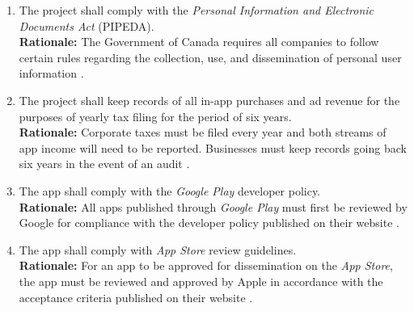 \documentclass{article}
\begin{document}


\begin{enumerate}[align=left, label=\textbf{CO\arabic*.}]
    \item The project shall comply with the \emph{Personal Information and Electronic Documents Act} (PIPEDA).\\
    {\bf Rationale:} The Government of Canada requires all companies to follow certain rules regarding the collection, use, and dissemination of personal user information \cite{PIPEDA}.
    \item The project shall keep records of all in-app purchases and ad revenue for the purposes of yearly tax filing for the period of six years.\\
    {\bf Rationale:} Corporate taxes must be filed every year and both streams of app income will need to be reported. Businesses must keep records going back six years in the event of an audit \cite{6Year}.
    \item The app shall comply with the \emph{Google Play} developer policy.\\
    {\bf Rationale:} All apps published through \emph{Google Play} must first be reviewed by Google for compliance with the developer policy published on their website \cite{GooglePlay}.
    \item The app shall comply with \emph{App Store} review guidelines.\\
    {\bf Rationale:} For an app to be approved for dissemination on the \emph{App Store}, the app must be reviewed and approved by Apple in accordance with the acceptance criteria published on their website \cite{AppStore}.
\end{enumerate}
\end{document}
